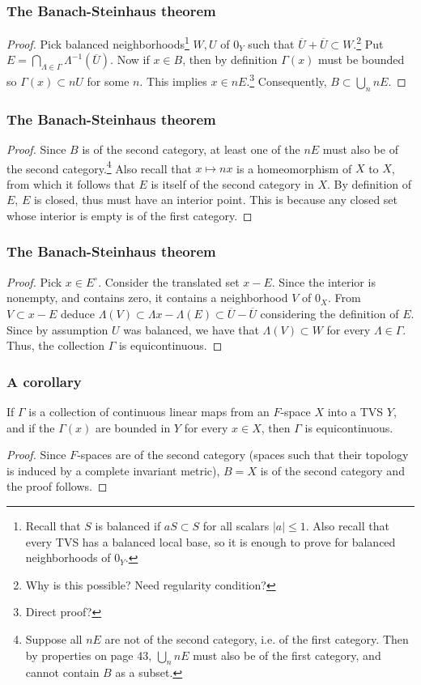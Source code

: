 \documentclass{beamer}
\begin{document}
\begin{frame}
\frametitle{The Banach-Steinhaus theorem}

\begin{proof}\renewcommand{\qedsymbol}{} Pick balanced neighborhoods\footnote{Recall that $S$ is balanced if $aS \subset S$ for all scalars $|a| \leq 1$. Also recall that every TVS has a balanced local base, so it is enough to prove for balanced neighborhoods of $0_Y$.} $W, U$ of $0_Y$ such that $\overline{U} + \overline{U} \subset W$.\footnote{Why is this possible? Need regularity condition?} Put $E =  \bigcap_{\Lambda \in \Gamma}\Lambda^{-1}(\overline{U})$. Now if $x \in B$, then by definition $\Gamma(x)$ must be bounded so $\Gamma(x) \subset nU$ for some $n$. This implies $x \in nE$.\footnote{Direct proof?} Consequently, $B \subset \bigcup_n nE$.
\end{proof}
\end{frame}
\begin{frame}
\frametitle{The Banach-Steinhaus theorem}
\begin{proof}\renewcommand{\qedsymbol}{}
Since $B$ is of the second category, at least one of the $nE$ must also be of the second category.\footnote{Suppose all $nE$ are not of the second category, i.e. of the first category. Then by properties on page 43, $\bigcup_n nE$ must also be of the first category, and cannot contain $B$ as a subset.} Also recall that $x \mapsto nx$ is a homeomorphism of $X$ to $X$, from which it follows that $E$ is itself of the second category in $X$. By definition of $E$, $E$ is closed, thus must have an interior point. This is because any closed set whose interior is empty is of the first category.
\end{proof}
\end{frame}
\begin{frame}
\frametitle{The Banach-Steinhaus theorem}
\begin{proof}
Pick $x \in E^\circ$. Consider the translated set $x -E$. Since the interior is nonempty, and contains zero, it contains a neighborhood $V$ of $0_X$. From $V \subset x -E$ deduce $\Lambda(V) \subset \Lambda x - \Lambda(E) \subset \overline{U} - \overline{U}$ considering the definition of $E$. Since by assumption $U$ was balanced, we have that $\Lambda(V) \subset W$ for every $\Lambda \in \Gamma$. Thus, the collection $\Gamma$ is equicontinuous.
\end{proof}
\end{frame}


\begin{frame}
\frametitle{A corollary}

\begin{theorem} If $\Gamma$ is a collection of continuous linear maps from an $F$-space $X$ into a TVS $Y$, and if the $\Gamma(x)$ are bounded in $Y$ for every $x \in X$, then $\Gamma$ is equicontinuous.
\end{theorem}
\begin{proof} Since $F$-spaces are of the second category (spaces such that their topology is induced by a complete invariant metric), $B = X$ is of the second category and the proof follows. \end{proof}
\end{frame}
\end{document}
